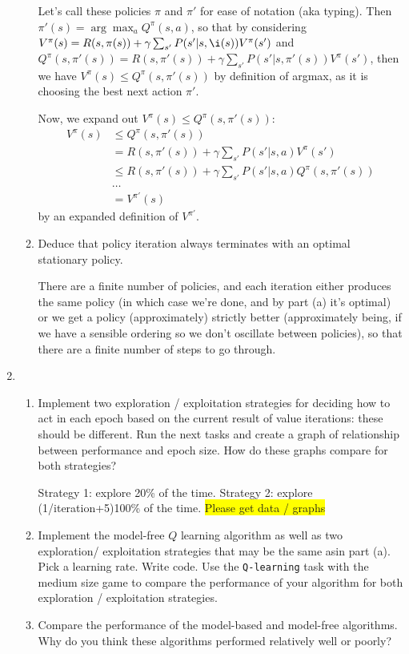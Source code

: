 \documentclass{article}
\newcommand{\edit}[1]{\colorbox{Yellow}{#1}}
\begin{document}
\begin{enumerate}
\begin{enumerate}
  Let's call these policies $\pi$ and $\pi'$ for ease of notation (aka typing).
  Then $\pi'(s)=\arg\max_a Q^\pi (s,a)$, so that by considering 
  $V^\pi(s)=R(s,\pi(s))+\gamma \sum_{s'}P(s'|s,\i(s))V^\pi(s')$ and 
  $Q^\pi(s,\pi'(s))=R(s,\pi'(s))+\gamma \sum_{s'} P(s'|s,\pi'(s)) V^\pi(s')$,
  then we have $V^\pi(s)\leq Q^\pi(s,\pi'(s))$
  by definition of argmax, as it is choosing the best next action $\pi'$. 

  Now, we expand out $V^\pi(s)\leq Q^\pi(s,\pi'(s))$:
  \begin{align*}
  V^\pi(s) & \leq Q^\pi(s,\pi'(s)) \\
  & = R(s,\pi'(s))+\gamma \sum_{s'} P(s'|s,a)V^\pi(s') \\
  & \leq R(s,\pi'(s))+\gamma \sum_{s'} P(s'|s,a) Q^\pi(s,\pi'(s))\\
  & \ldots \\
  & = V^{\pi'}(s)
  \end{align*}
  by an expanded definition of $V^{\pi'}$. 



  \item {Deduce that policy iteration always terminates with an
  optimal stationary policy.}
  
  There are a finite number of policies, and each iteration either produces
  the same policy (in which case we're done, and by part (a) it's optimal)
  or we get a policy (approximately) strictly better (approximately being, 
  if we have a sensible ordering so we don't oscillate between policies), so
  that there are a finite number of steps to go through. 

  \end{enumerate}

\item 
  \begin{enumerate}
  \item {Implement two exploration / exploitation strategies for deciding how to act
  in each epoch based on the current result of value iterations: these should be different.
  Run the next tasks and create a graph of relationship between performance and epoch
  size. How do these graphs compare for both strategies?}

  Strategy 1: explore 20\% of the time. Strategy 2: explore (1/iteration+5)100\% of the time. 
  \edit{Please get data / graphs}

  \item {Implement the model-free $Q$ learning algorithm as well as two exploration/
  exploitation strategies that may be the same asin part (a). Pick a learning rate. Write 
  code. Use the \texttt{Q-learning} task with the medium size game to compare the 
  performance of your algorithm for both exploration / exploitation strategies.}

  \item {Compare the performance of the model-based and model-free algorithms. Why 
  do you think these algorithms performed relatively well or poorly?}


  \end{enumerate}

\end{enumerate}
\end{document}
